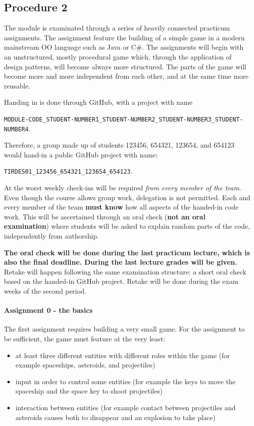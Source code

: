 \documentclass[titlepage,a4paper, 11pt]{article}
\begin{document}
\subsection{Procedure 2}
The module is examinated through a series of heavily connected practicum assignments. The assignment feature the building of a simple game in a modern mainstream OO language such as Java or C\#. The assignments will begin with an unstructured, mostly procedural game which, through the application of design patterns, will become always more structured. The parts of the game will become more and more independent from each other, and at the same time more reusable.

Handing in is done through GitHub, with a project with name 

\texttt{MODULE-CODE\_STUDENT-NUMBER1\_STUDENT-NUMBER2\_STUDENT-NUMBER3\_STUDENT-NUMBER4}. 

Therefore, a group made up of students 123456, 654321, 123654, and 654123 would hand-in a public GitHub project with name:

\texttt{TIRDES01\_123456\_654321\_123654\_654123}.

At the worst weekly check-ins will be required \textit{from every member of the team}. Even though the course allows group work, delegation is not permitted. Each and every member of the team \textbf{must know} how all aspects of the handed-in code work. This will be ascertained through an oral check (\textbf{not an oral examination}) where students will be asked to explain random parts of the code, independently from authorship.

\textbf{The oral check will be done during the last practicum lecture, which is also the final deadline. During the last lecture grades will be given.} Retake will happen following the same examination structure: a short oral check based on the handed-in GitHub project. Retake will be done during the exam weeks of the second period.

\paragraph*{Assignment 0 - the basics}
The first assignment requires building a very small game. For the assignment to be sufficient, the game must feature at the very least:
\begin{itemize}
\item at least three different entities with different roles within the game (for example spaceships, asteroids, and projectiles)
\item input in order to control some entities (for example the keys to move the spaceship and the space key to shoot projectiles)
\item interaction between entities (for example contact between projectiles and asteroids causes both to disappear and an explosion to take place)
\end{itemize}
\end{document}
